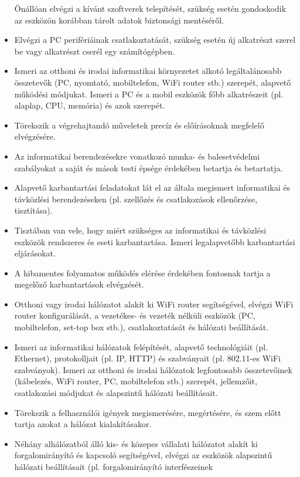 \begin{itemize}
  Önállóan elvégzi a kívánt szoftverek telepítését, szükség esetén
  gondoskodik az eszközön korábban tárolt adatok biztonsági mentéséről.
\item
  Elvégzi a PC perifériáinak csatlakoztatását, szükség esetén új
  alkatrészt szerel be vagy alkatrészt cserél egy számítógépben.
\item
  Ismeri az otthoni és irodai informatikai környezetet alkotó
  legáltalánosabb összetevők (PC, nyomtató, mobiltelefon, WiFi router
  stb.) szerepét, alapvető működési módjukat. Ismeri a PC és a mobil
  eszközök főbb alkatrészeit (pl. alaplap, CPU, memória) és azok
  szerepét.
\item
  Törekszik a végrehajtandó műveletek precíz és előírásoknak megfelelő
  elvégzésére.
\item
  Az informatikai berendezésekre vonatkozó munka- és balesetvédelmi
  szabályokat a saját és mások testi épsége érdekében betartja és
  betartatja.
\item
  Alapvető karbantartási feladatokat lát el az általa megismert
  informatikai és távközlési berendezéseken (pl. szellőzés és
  csatlakozások ellenőrzése, tisztítása).
\item
  Tisztában van vele, hogy miért szükséges az informatikai és távközlési
  eszközök rendszeres és eseti karbantartása. Ismeri legalapvetőbb
  karbantartási eljárásokat.
\item
  A hibamentes folyamatos működés elérése érdekében fontosnak tartja a
  megelőző karbantartások elvégzését.
\item
  Otthoni vagy irodai hálózatot alakít ki WiFi router segítségével,
  elvégzi WiFi router konfigurálását, a vezetékes- és vezeték nélküli
  eszközök (PC, mobiltelefon, set-top box stb.), csatlakoztatását és
  hálózati beállítását.
\item
  Ismeri az informatikai hálózatok felépítését, alapvető technológiáit
  (pl. Ethernet), protokolljait (pl. IP, HTTP) és szabványait (pl.
  802.11-es WiFi szabványok). Ismeri az otthoni és irodai hálózatok
  legfontosabb összetevőinek (kábelezés, WiFi router, PC, mobiltelefon
  stb.) szerepét, jellemzőit, csatlakozási módjukat és alapszintű
  hálózati beállításait.
\item
  Törekszik a felhasználói igények megismerésére, megértésére, és szem
  előtt tartja azokat a hálózat kialakításakor.
\item
  Néhány alhálózatból álló kis- és közepes vállalati hálózatot alakít ki
  forgalomirányító és kapcsoló segítségével, elvégzi az eszközök
  alapszintű hálózati beállításait (pl. forgalomirányító interfészeinek

\end{itemize}
